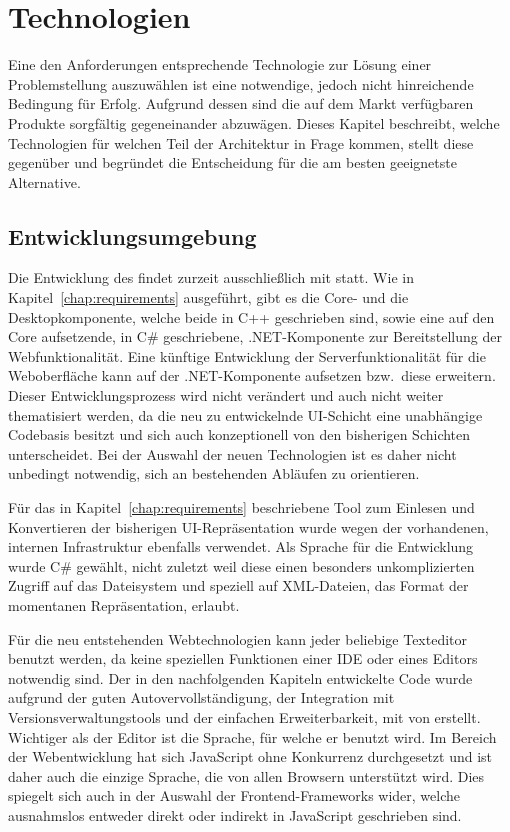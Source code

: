 \chapter{Technologien}\label{chap:technologies}
Eine den Anforderungen entsprechende Technologie zur Lösung einer Problemstellung auszuwählen ist eine notwendige, jedoch nicht hinreichende Bedingung für Erfolg. Aufgrund dessen sind die auf dem Markt verfügbaren Produkte sorgfältig gegeneinander abzuwägen. Dieses Kapitel beschreibt, welche Technologien für welchen Teil der Architektur in Frage kommen, stellt diese gegenüber und begründet die Entscheidung für die am besten geeignetste Alternative.

\section{Entwicklungsumgebung}
Die Entwicklung des  findet zurzeit ausschließlich mit  statt. Wie in Kapitel~\ref{chap:requirements} ausgeführt, gibt es die Core- und die Desktopkomponente, welche beide in C++ geschrieben sind, sowie eine auf den Core aufsetzende, in C\# geschriebene, .NET-Komponente zur Bereitstellung der Webfunktionalität. Eine künftige Entwicklung der Serverfunktionalität für die Weboberfläche kann auf der .NET-Komponente aufsetzen bzw.\ diese erweitern. Dieser Entwicklungsprozess wird nicht verändert und auch nicht weiter thematisiert werden, da die neu zu entwickelnde UI-Schicht eine unabhängige Codebasis besitzt und sich auch konzeptionell von den bisherigen Schichten unterscheidet. Bei der Auswahl der neuen Technologien ist es daher nicht unbedingt notwendig, sich an bestehenden Abläufen zu orientieren. 

Für das in Kapitel~\ref{chap:requirements} beschriebene Tool zum Einlesen und Konvertieren der bisherigen UI-Repräsentation wurde wegen der vorhandenen, internen Infrastruktur ebenfalls  verwendet. Als Sprache für die Entwicklung wurde C\# gewählt, nicht zuletzt weil diese einen besonders unkomplizierten Zugriff auf das Dateisystem und speziell auf XML-Dateien, das Format der momentanen Repräsentation, erlaubt. 

Für die neu entstehenden Webtechnologien kann jeder beliebige Texteditor benutzt werden, da keine speziellen Funktionen einer IDE oder eines Editors notwendig sind. Der in den nachfolgenden Kapiteln entwickelte Code wurde aufgrund der guten Autovervollständigung, der Integration mit Versionsverwaltungstools und der einfachen Erweiterbarkeit, mit  von  erstellt. Wichtiger als der Editor ist die Sprache, für welche er benutzt wird. Im Bereich der Webentwicklung hat sich JavaScript ohne Konkurrenz durchgesetzt und ist daher auch die einzige Sprache, die von allen Browsern unterstützt wird. Dies spiegelt sich auch in der Auswahl der Frontend-Frameworks wider, welche ausnahmslos entweder direkt oder indirekt in JavaScript geschrieben sind.   

